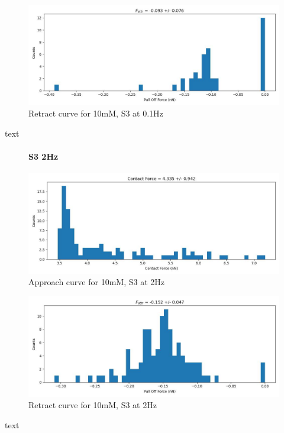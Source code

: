 \begin{figure}[h!]
\centering
\includegraphics[width=\textwidth]{chapter7/Tip speed/10mM/S3 0.1Hz/retract_f_a_hist.jpg}
\caption{Retract curve for 10mM, S3 at 0.1Hz}
\end{figure}
text
\newpage


\begin{figure}[h!]
\paragraph{S3 2Hz}
\centering
\includegraphics[width=\textwidth]{chapter7/Tip speed/10mM/S3 2Hz/approach_f_c_hist.jpg}
\caption{Approach curve for 10mM, S3 at 2Hz}
\end{figure}

\begin{figure}[h!]
\centering
\includegraphics[width=\textwidth]{chapter7/Tip speed/10mM/S3 2Hz/retract_f_a_hist.jpg}
\caption{Retract curve for 10mM, S3 at 2Hz}
\end{figure}
text
\newpage

